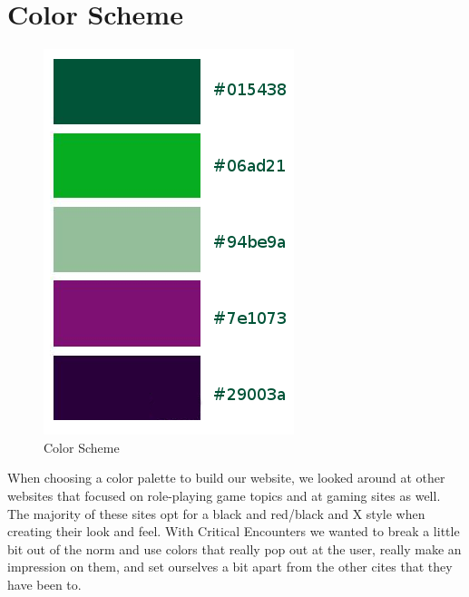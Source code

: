 \documentclass[12pt,a4paper]{report}
\begin{document}
	\section{Color Scheme}
	\begin{figure}[H]
		\centering
		\includegraphics[scale=.5]{colors}
		\caption{Color Scheme}
		\label{fig: Color Scheme}
	\end{figure}
	When choosing a color palette to build our website, we looked around at other websites that focused on role-playing game topics and at gaming sites as well. The majority of these sites opt for a black and red/black and X style when creating their look and feel. With Critical Encounters we wanted to break a little bit out of the norm and use colors that really pop out at the user, really make an impression on them, and set ourselves a bit apart from the other cites that they have been to.

	\newpage
\end{document}
